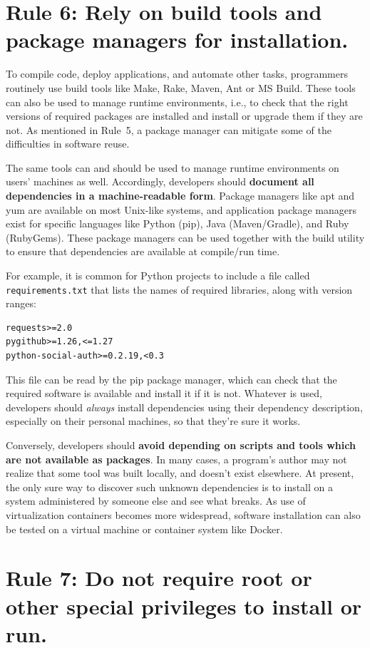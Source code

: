\documentclass[10pt,letterpaper]{article}
\newcommand{\rulemajor}[1]{\section{#1}}
\newcommand{\ruleminor}[1]{\textbf{#1}}
\begin{document}
\rulemajor{Rule 6: Rely on build tools and package managers for installation.}

To compile code, deploy applications, and automate other tasks, 
programmers routinely use build tools like Make, Rake, Maven, Ant or MS Build.
These tools can also be used to manage runtime environments,
i.e.,
to check that the right versions of required packages are installed
and install or upgrade them if they are not.
As mentioned in Rule~5,
a package manager can mitigate some of the difficulties in software reuse.

The same tools can and should be used to manage runtime environments on users' machines as well.
Accordingly,
developers should
\ruleminor{document all dependencies in a machine-readable form}.
Package managers like apt and yum are available on most Unix-like systems, and
application package managers exist for specific languages like Python (pip),
Java (Maven/Gradle), and Ruby (RubyGems). These package managers can be used
together with the build utility to ensure that dependencies are available at
compile/run time.

For example, it is common for Python projects to include a file called
\texttt{requirements.txt} that lists the names of required libraries,
along with version ranges:

\begin{verbatim}
requests>=2.0
pygithub>=1.26,<=1.27
python-social-auth>=0.2.19,<0.3
\end{verbatim}

This file can be read by the pip package manager, which can check that the
required software is available and install it if it is not. 
Whatever is used,
developers should \emph{always} install dependencies
using their dependency description, especially on their personal machines, so that
they're sure it works.

Conversely, developers should
\ruleminor{avoid depending on scripts and tools which are not available as packages}.
In many cases, a program's author may not realize that some tool was built locally, and
doesn't exist elsewhere. At present, the only sure way to discover such
unknown dependencies is to install on a system administered by someone
else and see what breaks. As use of virtualization containers becomes more
widespread, software installation can also be tested on a virtual machine or
container system like Docker.


\rulemajor{Rule 7: Do not require root or other special privileges to install or run.}
\end{document}
